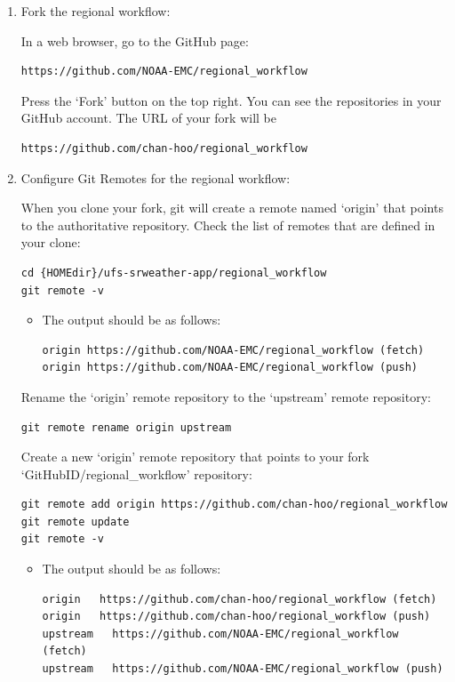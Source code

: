 \documentclass[11pt,fleqn]{report}              %
\begin{document}
\begin{enumerate}
\item Fork the regional workflow:

In a web browser, go to the GitHub page:
\lstset{language=bash}   
\begin{lstlisting}[frame=trBL]
https://github.com/NOAA-EMC/regional_workflow
\end{lstlisting}

Press the `Fork' button on the top right. You can see the repositories in your GitHub account. The URL of your fork will be
\lstset{language=bash}   
\begin{lstlisting}[frame=trBL]
https://github.com/chan-hoo/regional_workflow
\end{lstlisting}


\item Configure Git Remotes for the regional workflow:

When you clone your fork, git will create a remote named `origin' that points to the authoritative repository. Check the list of remotes that are defined in your clone:
\lstset{language=bash}   
\begin{lstlisting}[frame=trBL]
cd {HOMEdir}/ufs-srweather-app/regional_workflow
git remote -v
\end{lstlisting}

\begin{itemize}
\item The output should be as follows:
\lstset{language=bash}   
\begin{lstlisting}[frame=trBL]
origin https://github.com/NOAA-EMC/regional_workflow (fetch)
origin https://github.com/NOAA-EMC/regional_workflow (push)
\end{lstlisting}
\end{itemize}

Rename the `origin' remote repository to the `upstream' remote repository:
\lstset{language=bash}   
\begin{lstlisting}[frame=trBL]
git remote rename origin upstream
\end{lstlisting}

Create a new `origin' remote repository that points to your fork `{GitHubID}/regional\_workflow' repository:
\lstset{language=bash}   
\begin{lstlisting}[frame=trBL]
git remote add origin https://github.com/chan-hoo/regional_workflow
git remote update
git remote -v
\end{lstlisting}

\begin{itemize}
\item The output should be as follows:
\lstset{language=bash}   
\begin{lstlisting}[frame=trBL]
origin   https://github.com/chan-hoo/regional_workflow (fetch)
origin   https://github.com/chan-hoo/regional_workflow (push)
upstream   https://github.com/NOAA-EMC/regional_workflow (fetch)
upstream   https://github.com/NOAA-EMC/regional_workflow (push)
\end{lstlisting}
\end{itemize}



\end{enumerate}
\end{document}
